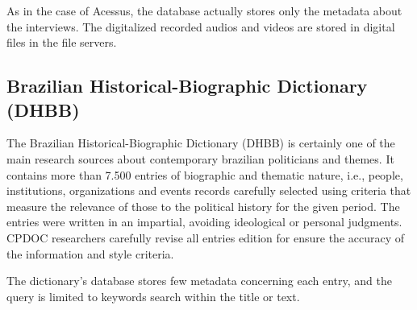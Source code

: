 As in the case of Acessus, the database actually stores only the
metadata about the interviews. The digitalized recorded audios and
videos are stored in digital files in the file servers.


\subsection{Brazilian Historical-Biographic Dictionary (DHBB)}

The Brazilian Historical-Biographic Dictionary (DHBB) is certainly one
of the main research sources about contemporary brazilian politicians
and themes. It contains more than 7.500 entries of biographic and
thematic nature, i.e., people, institutions, organizations and events
records carefully selected using criteria that measure the relevance
of those to the political history for the given period. The entries
were written in an impartial, avoiding ideological or personal
judgments. CPDOC researchers carefully revise all entries edition for
ensure the accuracy of the information and style criteria.


The dictionary's database stores few metadata concerning each entry,
and the query is limited to keywords search within the title or text.



